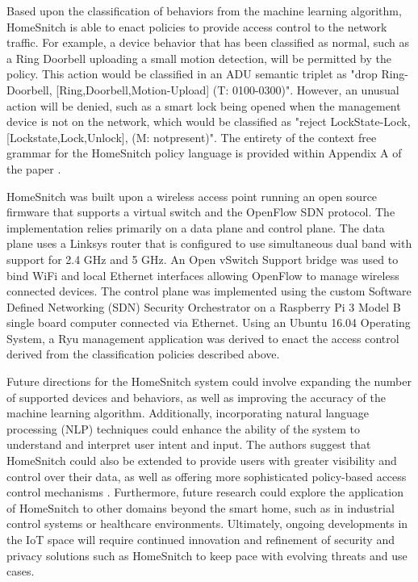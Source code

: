Based upon the classification of behaviors from the machine learning algorithm, HomeSnitch is able to enact policies to provide access control to the network traffic. For example, a device behavior that has been classified as normal, such as a Ring Doorbell uploading a small motion detection, will be permitted by the policy. This action would be classified in an ADU semantic triplet as "drop Ring-Doorbell, [Ring,Doorbell,Motion-Upload] (T: 0100-0300)". However, an unusual action will be denied, such as a smart lock being opened when the management device is not on the network, which would be classified as "reject LockState-Lock, [Lockstate,Lock,Unlock], (M: notpresent)". The entirety of the context free grammar for the HomeSnitch policy language is provided within Appendix A of the paper \cite{Enck}.

HomeSnitch was built upon a wireless access point running an open source firmware that supports a virtual switch and the OpenFlow SDN protocol. The implementation relies primarily on a data plane and control plane. The data plane uses a Linksys router that is configured to use simultaneous dual band with support for 2.4 GHz and 5 GHz. An Open vSwitch Support bridge was used to bind WiFi and local Ethernet interfaces allowing OpenFlow to manage wireless connected devices. The control plane  was implemented using the custom Software Defined Networking (SDN) Security Orchestrator on a Raspberry Pi 3 Model B single board computer connected via Ethernet. Using an Ubuntu 16.04 Operating System, a Ryu management application was derived to enact the access control derived from the classification policies described above. 

Future directions for the HomeSnitch system could involve expanding the number of supported devices and behaviors, as well as improving the accuracy of the machine learning algorithm. Additionally, incorporating natural language processing (NLP) techniques could enhance the ability of the system to understand and interpret user intent and input. The authors suggest that HomeSnitch could also be extended to provide users with greater visibility and control over their data, as well as offering more sophisticated policy-based access control mechanisms \cite{Enck}. Furthermore, future research could explore the application of HomeSnitch to other domains beyond the smart home, such as in industrial control systems or healthcare environments. Ultimately, ongoing developments in the IoT space will require continued innovation and refinement of security and privacy solutions such as HomeSnitch to keep pace with evolving threats and use cases.

